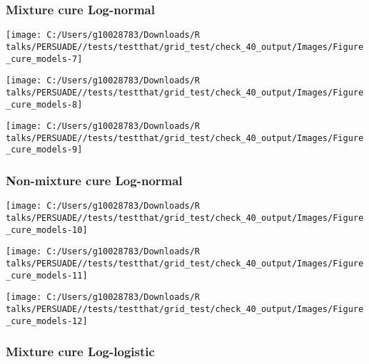 \documentclass[
]{article}
\begin{document}
\subsubsection{Mixture cure Log-normal}\label{mixture-cure-log-normal}

\begin{flushleft}\texttt{[image: C:/Users/g10028783/Downloads/R talks/PERSUADE//tests/testthat/grid\_test/check\_40\_output/Images/Figure\_cure\_models-7]} \end{flushleft}

\begin{flushleft}\texttt{[image: C:/Users/g10028783/Downloads/R talks/PERSUADE//tests/testthat/grid\_test/check\_40\_output/Images/Figure\_cure\_models-8]} \end{flushleft}

\begin{flushleft}\texttt{[image: C:/Users/g10028783/Downloads/R talks/PERSUADE//tests/testthat/grid\_test/check\_40\_output/Images/Figure\_cure\_models-9]} \end{flushleft}

\clearpage

\subsubsection{Non-mixture cure
Log-normal}\label{non-mixture-cure-log-normal}

\begin{flushleft}\texttt{[image: C:/Users/g10028783/Downloads/R talks/PERSUADE//tests/testthat/grid\_test/check\_40\_output/Images/Figure\_cure\_models-10]} \end{flushleft}

\begin{flushleft}\texttt{[image: C:/Users/g10028783/Downloads/R talks/PERSUADE//tests/testthat/grid\_test/check\_40\_output/Images/Figure\_cure\_models-11]} \end{flushleft}

\begin{flushleft}\texttt{[image: C:/Users/g10028783/Downloads/R talks/PERSUADE//tests/testthat/grid\_test/check\_40\_output/Images/Figure\_cure\_models-12]} \end{flushleft}

\clearpage

\subsubsection{Mixture cure
Log-logistic}\label{mixture-cure-log-logistic}
\end{document}
